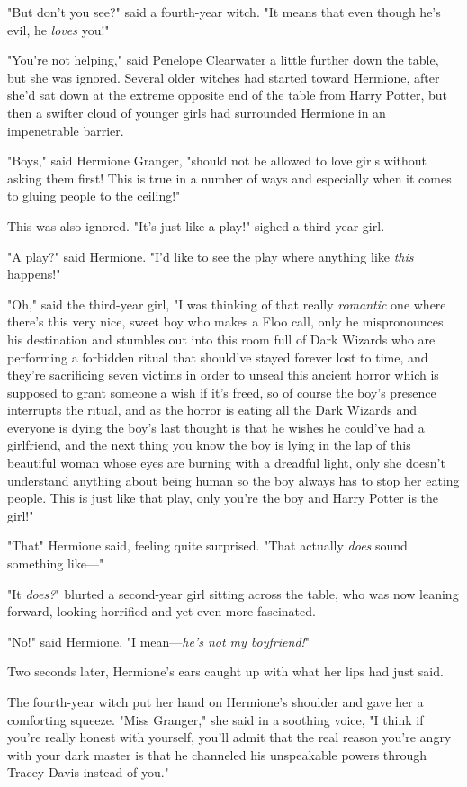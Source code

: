 "But don't you see?" said a fourth-year witch. "It means that even though he's
evil, he \emph{loves} you!"

"You're not helping," said Penelope Clearwater a little further down the table,
but she was ignored. Several older witches had started toward Hermione, after
she'd sat down at the extreme opposite end of the table from Harry Potter, but
then a swifter cloud of younger girls had surrounded Hermione in an
impenetrable barrier.

"Boys," said Hermione Granger, "should not be allowed to love girls without
asking them first! This is true in a number of ways and especially when it
comes to gluing people to the ceiling!"

This was also ignored. "It's just like a play!" sighed a third-year girl.

"A play?" said Hermione. "I'd like to see the play where anything like
\emph{this} happens!"

"Oh," said the third-year girl, "I was thinking of that really \emph{romantic}
one where there's this very nice, sweet boy who makes a Floo call, only he
mispronounces his destination and stumbles out into this room full of Dark
Wizards who are performing a forbidden ritual that should've stayed forever
lost to time, and they're sacrificing seven victims in order to unseal this
ancient horror which is supposed to grant someone a wish if it's freed, so of
course the boy's presence interrupts the ritual, and as the horror is eating
all the Dark Wizards and everyone is dying the boy's last thought is that he
wishes he could've had a girlfriend, and the next thing you know the boy is
lying in the lap of this beautiful woman whose eyes are burning with a dreadful
light, only she doesn't understand anything about being human so the boy always
has to stop her eating people. This is just like that play, only you're the boy
and Harry Potter is the girl!"

"That{\el}" Hermione said, feeling quite surprised. "That actually
\emph{does} sound something like\mbox{---}"

"It \emph{does?}" blurted a second-year girl sitting across the table, who was
now leaning forward, looking horrified and yet even more fascinated.

"No!" said Hermione. "I mean---\emph{he's not my boyfriend!}"

Two seconds later, Hermione's ears caught up with what her lips had just said.

The fourth-year witch put her hand on Hermione's shoulder and gave her a
comforting squeeze. "Miss Granger," she said in a soothing voice, "I think if
you're really honest with yourself, you'll admit that the real reason you're
angry with your dark master is that he channeled his unspeakable powers through
Tracey Davis instead of you."

